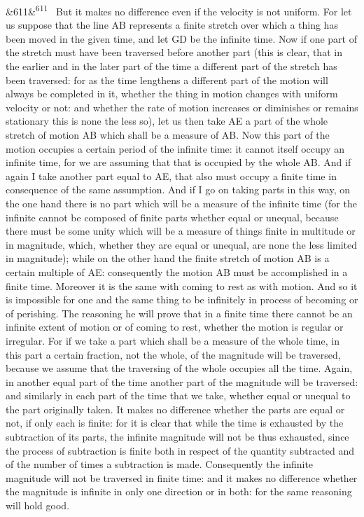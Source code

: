 \documentclass[12pt]{article}
\newcommand{\para}[1][]{\par\noindent\ifx&#1&\else\textsuperscript{\footnotesize #1}~\fi}
\begin{document}
\para[611] But it makes no difference even if the velocity is not uniform. For let us suppose that the line AB represents a finite stretch over which a thing has been moved in the given time, and let GD be the infinite time. Now if one part of the stretch must have been traversed before another part (this is clear, that in the earlier and in the later part of the time a different part of the stretch has been traversed: for as the time lengthens a different part of the motion will always be completed in it, whether the thing in motion changes with uniform velocity or not: and whether the rate of motion increases or diminishes or remains stationary this is none the less so), let us then take AE a part of the whole stretch of motion AB which shall be a measure of AB. Now this part of the motion occupies a certain period of the infinite time: it cannot itself occupy an infinite time, for we are assuming that that is occupied by the whole AB. And if again I take another part equal to AE, that also must occupy a finite time in consequence of the same assumption. And if I go on taking parts in this way, on the one hand there is no part which will be a measure of the infinite time (for the infinite cannot be composed of finite parts whether equal or unequal, because there must be some unity which will be a measure of things finite in multitude or in magnitude, which, whether they are equal or unequal, are none the less limited in magnitude); while on the other hand the finite stretch of motion AB is a certain multiple of AE: consequently the motion AB must be accomplished in a finite time. Moreover it is the same with coming to rest as with motion. And so it is impossible for one and the same thing to be infinitely in process of becoming or of perishing. The reasoning he will prove that in a finite time there cannot be an infinite extent of motion or of coming to rest, whether the motion is regular or irregular. For if we take a part which shall be a measure of the whole time, in this part a certain fraction, not the whole, of the magnitude will be traversed, because we assume that the traversing of the whole occupies all the time. Again, in another equal part of the time another part of the magnitude will be traversed: and similarly in each part of the time that we take, whether equal or unequal to the part originally taken. It makes no difference whether the parts are equal or not, if only each is finite: for it is clear that while the time is exhausted by the subtraction of its parts, the infinite magnitude will not be thus exhausted, since the process of subtraction is finite both in respect of the quantity subtracted and of the number of times a subtraction is made. Consequently the infinite magnitude will not be traversed in finite time: and it makes no difference whether the magnitude is infinite in only one direction or in both: for the same reasoning will hold good.
\end{document}
